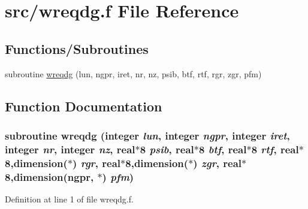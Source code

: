 \hypertarget{wreqdg_8f}{
\section{src/wreqdg.f File Reference}
\label{wreqdg_8f}
}
\subsection*{Functions/Subroutines}
\begin{CompactItemize}
\item 
subroutine \hyperlink{wreqdg_8f_fce636eb0715e13c0acb316b6ddda76b}{wreqdg} (lun, ngpr, iret, nr, nz, psib, btf, rtf, rgr, zgr, pfm)
\end{CompactItemize}


\subsection{Function Documentation}
\hypertarget{wreqdg_8f_fce636eb0715e13c0acb316b6ddda76b}{
\subsubsection[wreqdg]{\setlength{\rightskip}{0pt plus 5cm}subroutine wreqdg (integer {\em lun}, \/  integer {\em ngpr}, \/  integer {\em iret}, \/  integer {\em nr}, \/  integer {\em nz}, \/  real$\ast$8 {\em psib}, \/  real$\ast$8 {\em btf}, \/  real$\ast$8 {\em rtf}, \/  real$\ast$8,dimension($\ast$) {\em rgr}, \/  real$\ast$8,dimension($\ast$) {\em zgr}, \/  real$\ast$8,dimension(ngpr, $\ast$) {\em pfm})}}
\label{wreqdg_8f_fce636eb0715e13c0acb316b6ddda76b}




Definition at line 1 of file wreqdg.f.